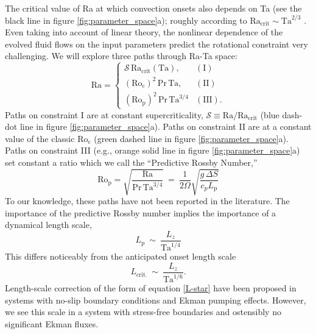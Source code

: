 \documentclass[twocolumn, amsmath, amsfonts, amssymb]{aastex62}
\newcommand{\pro}{\ensuremath{\text{Ro}_{\text{p}}}}
\newcommand{\con}{\ensuremath{\text{Ro}_{\text{c}}}}
\begin{document}
The critical value of Ra at which convection onsets also depends on Ta (see the black line in figure \ref{fig:parameter_space}a);  
roughly according to $\text{Ra}_{\text{crit}} \sim \text{Ta}^{2/3}$ \citep{Chandrasekhar,calkins&all2015a}.
Even taking into account of linear theory, the nonlinear dependence of the evolved fluid 
flows on the input parameters predict the rotational constraint very challenging. 
We will explore three paths through Ra-Ta space:
\begin{equation}
    \text{Ra} = 
    \begin{cases}
    \mathcal{S}\,\text{Ra}_\text{crit}(\text{Ta}), & (\text{I})\\
    (\con)^2 \, \text{Pr}\, \text{Ta}, & (\text{II}) \\
    (\pro)^2\, \text{Pr}\, \text{Ta}^{3/4} & (\text{III}).
    \end{cases}
    \label{eqn:paths}
\end{equation}
Paths on constraint I are at constant supercriticality, 
$\mathcal{S} \equiv \text{Ra}/\text{Ra}_{\text{crit}}$
(blue dash-dot line in figure \ref{fig:parameter_space}a).
Paths on constraint II are at a constant value of the classic $\con$ (green dashed line in figure \ref{fig:parameter_space}a). Paths on constraint
III (e.g., orange solid line in figure \ref{fig:parameter_space}a) 
set constant a ratio which we call the ``Predictive Rossby Number,'' 
\begin{equation}
\pro = \sqrt{\frac{\text{Ra}}{\text{Pr}\,\text{Ta}^{3/4}}} \ = \    \frac{1}{2 \Omega } \sqrt{\frac{g \, \Delta  S}{c_{p} L_{\text{p}}}}
\end{equation}
To our knowledge, these paths have not been reported in the literature. 
The importance of the predictive Rossby number implies the importance of a 
dynamical length scale, 
\begin{equation}
L_{\text{p}} \ \sim \ \frac{L_{z}}{\text{Ta}^{1/4}} \label{L-star}
\end{equation}
This differs noticeably from the anticipated onset length scale 
\begin{equation}
L_{\text{crit.}} \ \sim \ \frac{L_{z}}{\text{Ta}^{1/6}}.
\end{equation}
Length-scale correction of the form of equation \ref{L-star} 
have been proposed in systems with no-slip boundary conditions and Ekman pumping effects. However, we see this scale in a system with stress-free boundaries and ostensibly no significant Ekman fluxes. 
\end{document}
